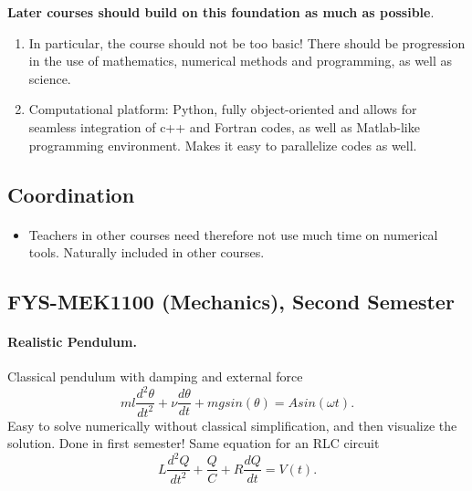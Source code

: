 \documentclass[%
twoside,                 %
final,                   %
10pt]{article}
\begin{document}
\textbf{Later courses should build on this foundation as much as possible}.

\begin{enumerate}
\item In particular, the course should not be too basic! There should be progression in the use of mathematics, numerical methods and programming, as well as science.

\item Computational platform: Python, fully object-oriented and allows for seamless integration of c++ and Fortran codes, as well as Matlab-like programming environment. Makes it easy to parallelize codes as well.
\end{enumerate}

\noindent



\subsection*{Coordination}

\paragraph{}
\begin{itemize}
\item Teachers in other courses need therefore not use much time on numerical tools. Naturally included in other courses.
\end{itemize}

\noindent





\subsection*{FYS-MEK1100 (Mechanics), Second Semester}

\paragraph{Realistic Pendulum.}

Classical pendulum with damping and external force
\[
  ml\frac{d^2\theta}{dt^2}+\nu\frac{d\theta}{dt}  +mgsin(\theta)=Asin(\omega t).
\]
Easy to solve numerically without classical simplification, and then visualize the solution.  Done in first semester!
Same equation for an RLC circuit 
\[
L\frac{d^2Q}{dt^2}+\frac{Q}{C}+R\frac{dQ}{dt}=V(t).
\]
\end{document}
